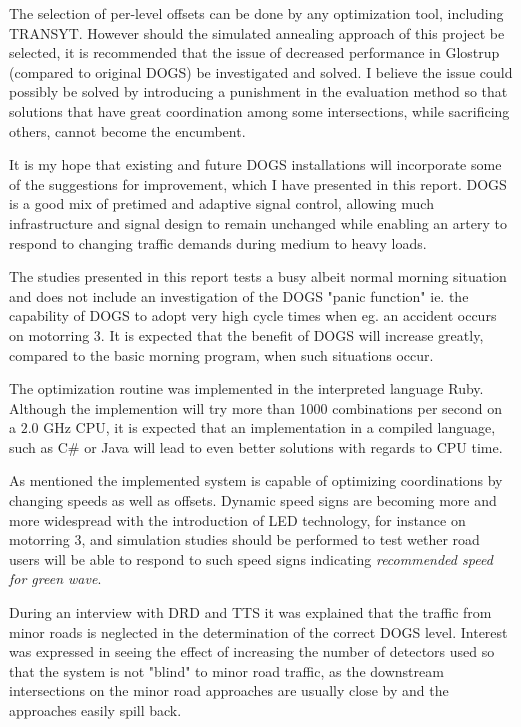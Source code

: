 The selection of per-level offsets can be done by any optimization tool, including TRANSYT. However should the simulated annealing approach of this project be selected, it is recommended that the issue of decreased performance in Glostrup (compared to original DOGS) be investigated and solved. I believe the issue could possibly be solved by introducing a punishment in the evaluation method so that solutions that have great coordination among some intersections, while sacrificing others, cannot become the encumbent.

It is my hope that existing and future DOGS installations will incorporate some of the suggestions for improvement, which I have presented in this report. DOGS is a good mix of pretimed and adaptive signal control, allowing much infrastructure and signal design to remain unchanged while enabling an artery to respond to changing traffic demands during medium to heavy loads.

The studies presented in this report tests a busy albeit normal morning situation and does not include an investigation of the DOGS "panic function" ie. the capability of DOGS to adopt very high cycle times when eg. an accident occurs on motorring 3. It is expected that the benefit of DOGS will increase greatly, compared to the basic morning program, when such situations occur.

The optimization routine was implemented in the interpreted language Ruby. Although the implemention will try more than 1000 combinations per second on a $2.0$ GHz CPU, it is expected that an implementation in a compiled language, such as C\# or Java will lead to even better solutions with regards to CPU time.

As mentioned the implemented system is capable of optimizing coordinations by changing speeds as well as offsets. Dynamic speed signs are becoming more and more widespread with the introduction of LED technology, for instance on motorring 3, and simulation studies should be performed to test wether road users will be able to respond to such speed signs indicating \textit{recommended speed for green wave}.

During an interview with DRD and TTS it was explained that the traffic from minor roads is neglected in the determination of the correct DOGS level. Interest was expressed in seeing the effect of increasing the number of detectors used so that the system is not "blind" to minor road traffic, as the downstream intersections on the minor road approaches are usually close by and the approaches easily spill back.

